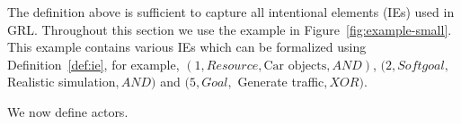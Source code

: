 The definition above is sufficient to capture all intentional elements (IEs) used in GRL. %
Throughout this section we use the example in Figure~\ref{fig:example-small}. This example contains various IEs which can be formalized using Definition~\ref{def:ie}, for example, 
$(1, Resource, \text{Car objects}, AND)$, $(2, Softgoal,$ Realistic simulation$, AND)$ and $(5, Goal,$ Generate traffic$, XOR)$.

We now define actors.

